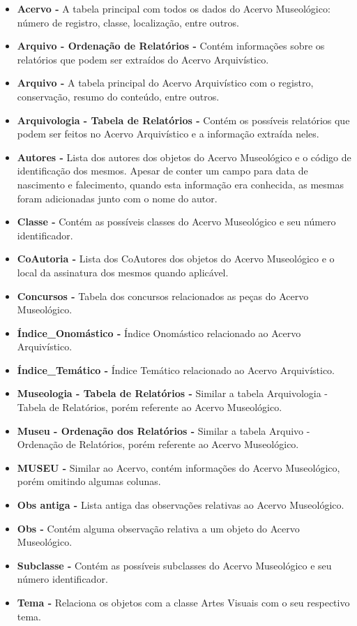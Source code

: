 \documentclass[a4paper,12pt,oneside,onecolumn,final,fleqn]{repUERJ}
\begin{document}
\begin{itemize}
	\item \textbf{Acervo -} A tabela principal com todos os dados do Acervo Museológico: número de registro, classe, localização, entre outros.
	\item \textbf{Arquivo - Ordenação de Relatórios -} Contém informações sobre os relatórios que podem ser extraídos do Acervo Arquivístico.
	\item \textbf{Arquivo -} A tabela principal do Acervo Arquivístico com o registro, conservação, resumo do conteúdo, entre outros.
	\item \textbf{Arquivologia - Tabela de Relatórios -} Contém os possíveis relatórios que podem ser feitos no Acervo Arquivístico e a informação extraída neles.
	\item \textbf{Autores -} Lista dos autores dos objetos do Acervo Museológico e o código de identificação dos mesmos. Apesar de conter um campo para data de nascimento e falecimento, quando esta informação era conhecida, as mesmas foram adicionadas junto com o nome do autor.
	\item \textbf{Classe -} Contém as possíveis classes do Acervo Museológico e seu número identificador.
	\item \textbf{CoAutoria -} Lista dos CoAutores dos objetos do Acervo Museológico e o local da assinatura dos mesmos quando aplicável.
	\item \textbf{Concursos -} Tabela dos concursos relacionados as peças do Acervo Museológico.
	\item \textbf{Índice\_Onomástico -} Índice Onomástico relacionado ao Acervo Arquivístico.
	\item \textbf{Índice\_Temático -} Índice Temático relacionado ao Acervo Arquivístico.
	\item \textbf{Museologia - Tabela de Relatórios -} Similar a tabela Arquivologia - Tabela de Relatórios, porém referente ao Acervo Museológico.
	\item \textbf{Museu - Ordenação dos Relatórios -} Similar a tabela Arquivo - Ordenação de Relatórios, porém referente ao Acervo Museológico.
	\item \textbf{MUSEU -} Similar ao Acervo, contém informações do Acervo Museológico, porém omitindo algumas colunas.
	\item \textbf{Obs antiga -} Lista antiga das observações relativas ao Acervo Museológico.
	\item \textbf{Obs -} Contém alguma observação relativa a um objeto do Acervo Museológico.
	\item \textbf{Subclasse -} Contém as possíveis subclasses do Acervo Museológico e seu número identificador.
	\item \textbf{Tema -} Relaciona os objetos com a classe Artes Visuais com o seu respectivo tema.
\end{itemize}
\end{document}
